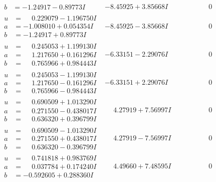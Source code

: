\documentclass[1p]{elsarticle_modified}
\theoremstyle{definition}
\begin{document}
$$\begin{array}{c|c|c}
\begin{aligned}
b &= -1.24917 - 0.89773 I\end{aligned}
 & -8.45925 + 3.85668 I & \phantom{-0.000000 } 0 \\ \hline\begin{aligned}
u &= \phantom{-}0.229079 - 1.196750 I \\
a &= -1.008010 + 0.054354 I \\
b &= -1.24917 + 0.89773 I\end{aligned}
 & -8.45925 - 3.85668 I & \phantom{-0.000000 } 0 \\ \hline\begin{aligned}
u &= \phantom{-}0.245053 + 1.199130 I \\
a &= \phantom{-}1.217650 + 0.161296 I \\
b &= \phantom{-}0.765966 + 0.984443 I\end{aligned}
 & -6.33151 - 2.29076 I & \phantom{-0.000000 } 0 \\ \hline\begin{aligned}
u &= \phantom{-}0.245053 - 1.199130 I \\
a &= \phantom{-}1.217650 - 0.161296 I \\
b &= \phantom{-}0.765966 - 0.984443 I\end{aligned}
 & -6.33151 + 2.29076 I & \phantom{-0.000000 } 0 \\ \hline\begin{aligned}
u &= \phantom{-}0.690509 + 1.013290 I \\
a &= \phantom{-}0.271550 - 0.438017 I \\
b &= \phantom{-}0.636320 + 0.396799 I\end{aligned}
 & \phantom{-}4.27919 + 7.56997 I & \phantom{-0.000000 } 0 \\ \hline\begin{aligned}
u &= \phantom{-}0.690509 - 1.013290 I \\
a &= \phantom{-}0.271550 + 0.438017 I \\
b &= \phantom{-}0.636320 - 0.396799 I\end{aligned}
 & \phantom{-}4.27919 - 7.56997 I & \phantom{-0.000000 } 0 \\ \hline\begin{aligned}
u &= \phantom{-}0.741818 + 0.983769 I \\
a &= \phantom{-}0.037784 + 0.174240 I \\
b &= -0.592605 + 0.288360 I\end{aligned}
 & \phantom{-}4.49660 + 7.48595 I & \phantom{-0.000000 } 0 \\ \hline\begin{aligned}

\end{aligned}
\end{array}$$
\end{document}
